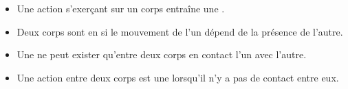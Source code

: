 \begin{mybilan}
	\begin{itemize}
		\item Une action s'exerçant sur un corps entraîne une .
		\item Deux corps sont en  si le mouvement de l'un dépend de la présence de l'autre. 
		\item Une  ne peut exister qu'entre deux corps en contact l'un avec l'autre.
		\item Une action entre deux corps est une  lorsqu'il n'y a pas de contact entre eux. 
	\end{itemize}
\end{mybilan}